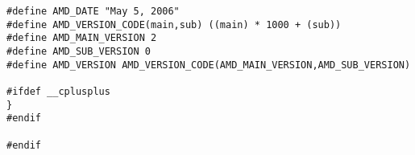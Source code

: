 \documentclass[11pt]{article}
\begin{document}
{\begin{verbatim}
#define AMD_DATE "May 5, 2006"
#define AMD_VERSION_CODE(main,sub) ((main) * 1000 + (sub))
#define AMD_MAIN_VERSION 2
#define AMD_SUB_VERSION 0
#define AMD_VERSION AMD_VERSION_CODE(AMD_MAIN_VERSION,AMD_SUB_VERSION)

#ifdef __cplusplus
}
#endif

#endif
\end{verbatim}
}

\newpage



\end{document}
